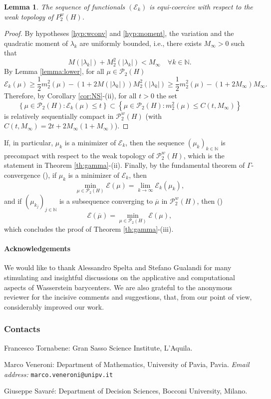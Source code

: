 \documentclass[12pt,a4paper]{article}
\newcommand{\N}{\mathbb{N}}
\renewcommand{\P}{\mathcal{P}}
\newcommand{\X}{\mathcal{P}_2(H)}
\theoremstyle{plain}
\newtheorem{lemma}[theorem]{Lemma}
\theoremstyle{definition}
\begin{document}
\begin{lemma}
The sequence of functionals $(\mathcal E_k)$ is equi-coercive with respect to the weak topology of $P_2^w(H)$.
\end{lemma}
\begin{proof}
By hypotheses \eqref{hyp:wconv} and \eqref{hyp:moment}, the variation and the quadratic moment of $\lambda_k$ are uniformly bounded, i.e., there exists $M_\infty>0$ such that
\[
	M(|\lambda_k|) +M_2^2(|\lambda_k|) < M_\infty\quad \forall k\in \N.
\]
By Lemma \ref{lemma:lower}, for all $\mu \in \X$
\[
	\mathcal E_k(\mu) \geq \frac 12 m_2^2(\mu) - (1+2M(|\lambda_k|))M_2^2(|\lambda_k|)\geq \frac 12 m_2^2(\mu) - (1+2M_\infty)M_\infty.
\]
Therefore, by Corollary \ref{cor:NS}-(ii), for all $t>0$ the set
\[
	\left\{ \mu \in \X: \mathcal{E}_k(\mu) \leq t\right\} \subset \left\{ \mu \in \X: m_2^2(\mu) \leq C(t,M_\infty)\right\}
\]
is relatively sequentially compact in $\P_2^w(H)$ (with $C(t,M_\infty)=2t+2M_\infty(1+M_\infty)$).
\end{proof}
If, in particular, $\mu_k$  is a minimizer of $\mathcal{E}_k$, then the sequence $(\mu_k)_{k\in \N}$ is precompact with respect to the weak topology of $\P_2^w(H)$, which is the statement in Theorem \ref{th:gamma}-(ii). Finally, by the fundamental theorem of $\Gamma$-convergence (\cite[Theorem 7.4]{dalmaso}), if $\mu_k$  is a minimizer of $\mathcal{E}_k$, then
\[
	\min_{\mu \in \X}\mathcal E(\mu) = \lim_{k \to \infty} \mathcal{E}_k(\mu_k),
\]
and if $(\mu_{k_j})_{j\in \N}$ is a subsequence converging to $\overline \mu$ in $\P_2^w(H)$, then (\cite[Corollary 7.20]{dalmaso}) 
\[
	\mathcal E(\overline \mu) = \min_{\mu \in \X}\mathcal E(\mu),
\]
which concludes the proof of Theorem \ref{th:gamma}-(iii).


\paragraph{Acknowledgements}

We would like to thank Alessandro Spelta and Stefano Gualandi for many stimulating and insightful discussions on the applicative and computational aspects of Wasserstein barycenters. We are also grateful to the anonymous reviewer for the incisive comments and suggestions, that, from our point of view, considerably improved our work.


\subsubsection*{Contacts}

Francesco Tornabene: Gran Sasso Science Institute, L'Aquila.
\smallskip

\noindent Marco Veneroni: Department of Mathematics, University of Pavia, Pavia. \textit{Email address:} \texttt{marco.veneroni@unipv.it} 
\smallskip

\noindent Giuseppe Savar\'e: Department of Decision Sciences, Bocconi University, Milano.
\end{document}

